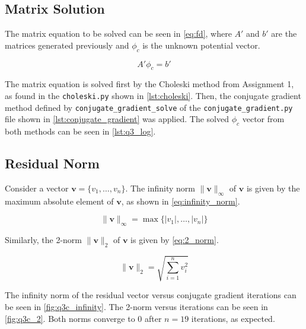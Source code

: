 \documentclass[a4paper,titlepage]{article}
\begin{document}
	\subsection{Matrix Solution}
	
	The matrix equation to be solved can be seen in \cref{eq:fd}, where $A'$ and $b'$ are the matrices generated previously and $\phi_c$ is the unknown potential vector.
	
	\begin{equation} \label{eq:fd}
		A'\phi_c = b'
	\end{equation}
	
	The matrix equation is solved first by the Choleski method from Assignment 1, as found in the \texttt{choleski.py} shown in \cref{lst:choleski}. Then, the conjugate gradient method defined by \texttt{conjugate_gradient_solve} of the \texttt{conjugate_gradient.py} file shown in \cref{lst:conjugate_gradient} was applied. The solved $\phi_c$ vector from both methods can be seen in \cref{lst:q3_log}.
	
	\subsection{Residual Norm}
	
	Consider a vector $\textbf{v} = \{v_1, \ldots, v_n\}$. The infinity norm $\|\textbf{v}\|_\infty$ of $\textbf{v}$ is given by the maximum absolute element of $\textbf{v}$, as shown in \cref{eq:infinity_norm}.
	
	\begin{equation} \label{eq:infinity_norm}
		\|\textbf{v}\|_\infty = \max\{|v_1|, \ldots, |v_n|\}
	\end{equation}
	
	Similarly, the 2-norm $\|\textbf{v}\|_2$ of $\textbf{v}$ is given by \cref{eq:2_norm}.
	
	\begin{equation} \label{eq:2_norm}
		\|\textbf{v}\|_2 = \sqrt{\sum_{i = 1}^{n} v_i^2}
	\end{equation}
	
	The infinity norm of the residual vector versus conjugate gradient iterations can be seen in \cref{fig:q3c_infinity}. The 2-norm versus iterations can be seen in \cref{fig:q3c_2}. Both norms converge to 0 after $n = 19$ iterations, as expected.
	
\end{document}
